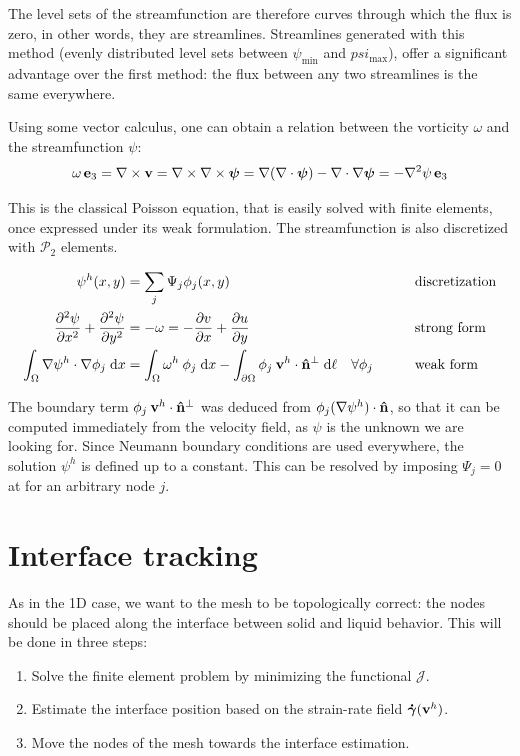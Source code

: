\documentclass[11 pt]{report}
\begin{document}
The level sets of the streamfunction are therefore curves through which the flux is zero, in other words, they are streamlines. Streamlines generated with this method (evenly distributed level sets between $\psi_{\min}$ and $psi_{\max}$), offer a significant advantage over the first method: the flux between any two streamlines is the same everywhere.

Using some vector calculus, one can obtain a relation between the vorticity $\omega$ and the streamfunction $\psi$:
\begin{equation}
    \omega \,\mathbf{e}_3 = \nabla \times \mathbf{v} = \nabla \times \nabla \times \boldsymbol\psi = \nabla (\nabla \cdot \boldsymbol\psi) - \nabla \cdot \nabla \boldsymbol\psi = - \nabla^2 \psi \,\mathbf{e}_3
\end{equation}

This is the classical Poisson equation, that is easily solved with finite elements, once expressed under its weak formulation. The streamfunction is also discretized with $\mathcal{P}_2$ elements.
\begin{empheqboxed}
    \begin{equation}
        \begin{aligned}
            \psi^h(x,y) &= \sum_{j} \Psi_j \phi_j(x,y) && \text{discretization}\\
            \pdv[2]{\psi}{x} + \pdv[2]{\psi}{y} &= -\omega = -\pdv{v}{x} + \pdv{u}{y} && \text{strong form}\\
            \int_{\Omega} \nabla \psi^h \cdot \nabla \phi_j \;\dd x &= \int_{\Omega} \omega^h \:\phi_j\; \dd x - \int_{\partial \Omega} \phi_j \: \mathbf{v}^h \cdot \mathbf{\hat n}^\perp \;\dd \ell \quad \forall \phi_j\qquad && \text{weak form}
        \end{aligned}
    \end{equation}
\end{empheqboxed}
The boundary term $\phi_j \:\mathbf{v}^h\cdot \mathbf{\hat n}^\perp$ was deduced from $\phi_j (\nabla \psi^h) \cdot \mathbf{\hat n} $, so that it can be computed immediately from the velocity field, as $\psi$ is the unknown we are looking for. Since Neumann boundary conditions are used everywhere, the solution $\psi^h$ is defined up to a constant. This can be resolved by imposing $\Psi_j=0$ at for an arbitrary node $j$.

\section{Interface tracking}
As in the 1D case, we want to the mesh to be topologically correct: the nodes should be placed along the interface between solid and liquid behavior. This will be done in three steps:
\begin{enumerate}
    \item Solve the finite element problem by minimizing the functional $\mathcal{J}$.
    \item Estimate the interface position based on the strain-rate field $\boldsymbol{\dot \gamma}(\mathbf{v}^h)$.
    \item Move the nodes of the mesh towards the interface estimation.
\end{enumerate}
\end{document}

